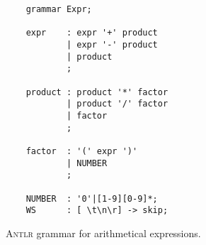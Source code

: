\begin{figure}[!ht]
\centering
\begin{verbatim}
    grammar Expr;
    
    expr    : expr '+' product 
            | expr '-' product
            | product        
            ;
    
    product : product '*' factor 
            | product '/' factor 
            | factor
            ;
    
    factor  : '(' expr ')'
            | NUMBER
            ;
    
    NUMBER  : '0'|[1-9][0-9]*;
    WS      : [ \t\n\r] -> skip;
\end{verbatim}
\vspace*{-0.3cm}
\caption{\textsc{Antlr} grammar for arithmetical expressions.}
\label{fig:Expr.g4}
\end{figure}


